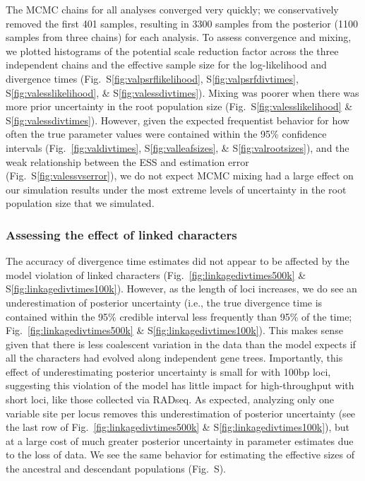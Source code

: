 The MCMC chains for all analyses converged very quickly;
we conservatively removed the first 401 samples, resulting in 3300 samples from
the posterior (1100 samples from three chains) for each analysis.
To assess convergence and mixing, we plotted histograms of the potential scale
reduction factor across the three independent chains and the effective sample
size for the log-likelihood and divergence times
(Fig.\ S\ref{fig:valpsrflikelihood}, S\ref{fig:valpsrfdivtimes},
S\ref{fig:valesslikelihood}, \& S\ref{fig:valessdivtimes}).
Mixing was poorer when there was more prior uncertainty in the root population
size
(Fig.\ S\ref{fig:valesslikelihood} \& S\ref{fig:valessdivtimes}).
However, given the expected frequentist behavior for how often the true
parameter values were contained within the 95\% confidence intervals (Fig.\ 
\ref{fig:valdivtimes}, S\ref{fig:valleafsizes}, \& S\ref{fig:valrootsizes}),
and the weak relationship between the ESS and estimation error
(Fig.~S\ref{fig:valessvserror}),
we do not expect MCMC mixing had a large effect on our simulation results under
the most extreme levels of uncertainty in the root population size that we
simulated.



\subsubsection{Assessing the effect of linked characters}

The accuracy of divergence time estimates did not appear to be affected by the
model violation of linked characters
(Fig.\ \ref{fig:linkagedivtimes500k}
\&
S\ref{fig:linkagedivtimes100k}).
However,
as the length of loci increases, we do see an underestimation
of posterior uncertainty (i.e., the 
true divergence time is contained within the 95\% credible interval
less frequently than 95\% of the time;
Fig.\ \ref{fig:linkagedivtimes500k}
\&
S\ref{fig:linkagedivtimes100k}).
This makes sense given that there is less coalescent variation in the data than
the model expects if all the characters had evolved along independent gene
trees.
Importantly, this effect of underestimating posterior uncertainty is small
for \datasets with 100bp loci, suggesting this violation of the model has little
impact for high-throughput \datasets with short loci, like those collected via
RADseq.
As expected, analyzing only one variable site per locus removes this underestimation
of posterior uncertainty
(see the last row of Fig.\ \ref{fig:linkagedivtimes500k}
\&
S\ref{fig:linkagedivtimes100k}),
but at a large cost of much greater posterior uncertainty in parameter
estimates due to the loss of data.
We see the same behavior for estimating the effective sizes of the ancestral
and descendant populations
(Fig.\ S).

